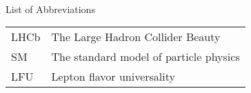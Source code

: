 \singlespacing \normalsize
\hbox{\ }

\vspace{.5in}

\begin{center}
\large{List of Abbreviations}
\end{center}

\vspace{3pt}

\begin{supertabular}{ll}
    LHCb  & The Large Hadron Collider Beauty \\
    SM    & The standard model of particle physics \\
    LFU   & Lepton flavor universality \\
\end{supertabular}
